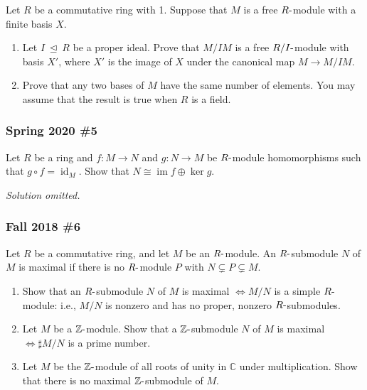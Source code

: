 Let \(R\) be a commutative ring with 1. Suppose that \(M\) is a free
\(R{\hbox{-}}\)module with a finite basis \(X\).

\begin{enumerate}
\def\labelenumi{\alph{enumi}.}
\item
  Let \(I {~\trianglelefteq~}R\) be a proper ideal. Prove that \(M/IM\)
  is a free \(R/I{\hbox{-}}\)module with basis \(X'\), where \(X'\) is
  the image of \(X\) under the canonical map \(M\to M/IM\).
\item
  Prove that any two bases of \(M\) have the same number of elements.
  You may assume that the result is true when \(R\) is a field.
\end{enumerate}

\hypertarget{spring-2020-5}{%
\subsubsection{Spring 2020 \#5}\label{spring-2020-5}}

Let \(R\) be a ring and \(f: M\to N\) and \(g: N\to M\) be
\(R{\hbox{-}}\)module homomorphisms such that
\(g\circ f = \operatorname{id}_M\). Show that
\(N \cong \operatorname{im}f \oplus \ker g\).

\emph{Solution omitted.}

\hypertarget{fall-2018-6}{%
\subsubsection{Fall 2018 \#6}\label{fall-2018-6}}

Let \(R\) be a commutative ring, and let \(M\) be an
\(R{\hbox{-}}\)module. An \(R{\hbox{-}}\)submodule \(N\) of \(M\) is
maximal if there is no \(R{\hbox{-}}\)module \(P\) with
\(N \subsetneq P \subsetneq M\).

\begin{enumerate}
\def\labelenumi{\alph{enumi}.}
\item
  Show that an \(R{\hbox{-}}\)submodule \(N\) of \(M\) is maximal
  \(\iff M /N\) is a simple \(R{\hbox{-}}\)module: i.e., \(M /N\) is
  nonzero and has no proper, nonzero \(R{\hbox{-}}\)submodules.
\item
  Let \(M\) be a \({\mathbb{Z}}{\hbox{-}}\)module. Show that a
  \({\mathbb{Z}}{\hbox{-}}\)submodule \(N\) of \(M\) is maximal
  \(\iff {\sharp}M /N\) is a prime number.
\item
  Let \(M\) be the \({\mathbb{Z}}{\hbox{-}}\)module of all roots of
  unity in \({\mathbb{C}}\) under multiplication. Show that there is no
  maximal \({\mathbb{Z}}{\hbox{-}}\)submodule of \(M\).
\end{enumerate}

